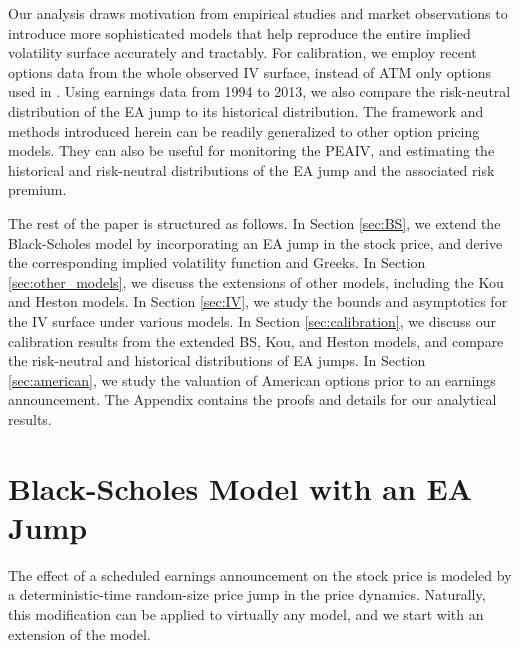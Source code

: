 \documentclass[11pt]{article}
\numberwithin{equation}{section}
\numberwithin{theorem}{section}
\begin{document}
  Our analysis  draws motivation from  empirical studies and market observations to  introduce more sophisticated models that  help reproduce   the entire implied volatility surface  accurately  
and tractably.   For  calibration, we employ recent  options  data  from the whole observed IV surface, instead of ATM only options used in \citet{Dubinsky2006}.  Using earnings data from 1994 to 2013, we   also compare  the risk-neutral  distribution of the EA jump  to its historical distribution. The framework and methods  introduced herein can be readily  generalized to other option pricing models. They can also be useful for monitoring the PEAIV, and  estimating the historical and risk-neutral  distributions of the EA jump and the associated risk premium.    


The rest of the paper is structured  as follows. In Section \ref{sec:BS}, we extend the Black-Scholes model by  incorporating an  EA jump in the  stock price, and derive the corresponding implied volatility function and Greeks. In Section \ref{sec:other_models}, we discuss the extensions of  other models, including  the Kou and Heston models. In Section \ref{sec:IV}, we study the  bounds and  asymptotics  for the IV surface under various models.  In Section \ref{sec:calibration}, we discuss our calibration results from  the extended BS,
Kou, and Heston models, and compare the risk-neutral  and historical distributions of  EA jumps. In Section \ref{sec:american}, we study  the valuation of
American options prior to an earnings announcement. The Appendix contains the proofs and details for our analytical results.


\section{Black-Scholes Model with an EA Jump\label{sec:BS}}\label{sect-BS}
The effect of a scheduled earnings  announcement on the stock price is modeled by a deterministic-time
random-size price  jump in the price dynamics. Naturally, this modification can be applied to virtually any model, and we start with  an extension of the  \citet{Black1973} model.
\end{document}
